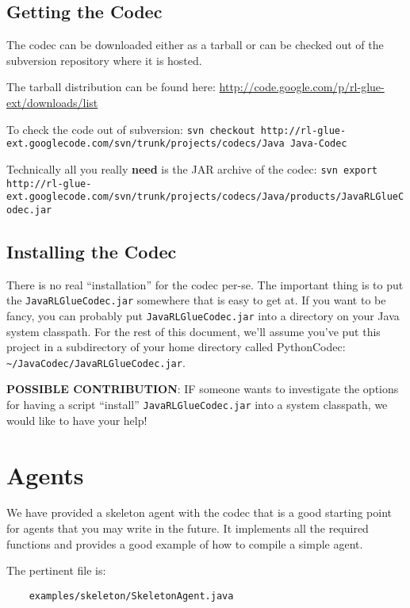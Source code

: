 \documentclass[11pt]{article}
\begin{document}
\subsection{Getting the Codec}
The codec can be downloaded either as a tarball or can be checked out of the subversion repository where it is hosted.

The tarball distribution can be found here:\newline
\url{http://code.google.com/p/rl-glue-ext/downloads/list}


To check the code out of subversion:\newline
\texttt{svn checkout http://rl-glue-ext.googlecode.com/svn/trunk/projects/codecs/Java Java-Codec}

Technically all you really \textbf{need} is the JAR archive of the codec:\newline
\footnotesize \texttt{svn export http://rl-glue-ext.googlecode.com/svn/trunk/projects/codecs/Java/products/JavaRLGlueCodec.jar} \normalsize

\subsection{Installing the Codec}
There is no real ``installation'' for the codec per-se.  The important thing is to put the \texttt{JavaRLGlueCodec.jar} somewhere that is easy to get at.  If you want to be fancy, you can probably put \texttt{JavaRLGlueCodec.jar}
into a directory on your Java system classpath.  For the rest of this document, we'll assume you've put this project in a subdirectory of your 
home directory called PythonCodec: \texttt{\~{}/JavaCodec/JavaRLGlueCodec.jar}.

\textbf{POSSIBLE CONTRIBUTION}: IF someone wants to investigate the options for having a script ``install'' \texttt{JavaRLGlueCodec.jar} into a system classpath, we would like to have your help!



\section{Agents}
\label{sec:agent}
We have provided a skeleton agent with the codec that is a good starting point for agents that you may write in the future.
It implements all the required functions and provides a good example of how to compile a simple agent.

The pertinent file is:
\begin{verbatim}
	examples/skeleton/SkeletonAgent.java
\end{verbatim}
\end{document}
